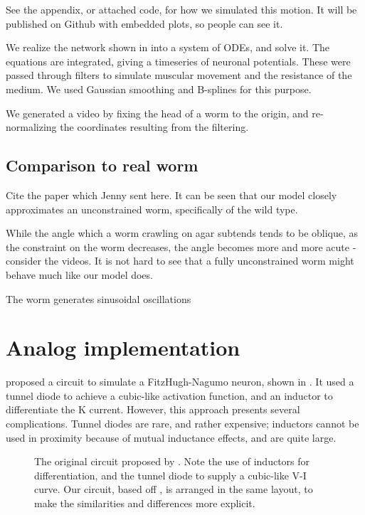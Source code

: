 \documentclass[
    11pt,
]{article}
\begin{document}
See the appendix, or attached code, for how we simulated this motion.  It will be published on Github with embedded plots, so people can see it.

We realize the network shown in  into a system of ODEs, and solve it.  The equations are integrated, giving a timeseries of neuronal potentials.  These were passed through filters to simulate muscular movement and the resistance of the medium.  We used Gaussian smoothing and B-splines for this purpose.

We generated a video by fixing the head of a worm to the origin, and re-normalizing the coordinates resulting from the filtering.

\subsection{Comparison to real worm}

Cite the paper which Jenny sent here.  It can be seen that our model closely approximates an unconstrained worm, specifically of the wild type.

While the angle which a worm crawling on agar subtends tends to be oblique, as the constraint on the worm decreases, the angle becomes more and more acute - consider the videos.  It is not hard to see that a fully unconstrained worm might behave much like our model does.

The worm generates sinusoidal oscillations


\section{Analog implementation}

\citet{nagumo1962} proposed a circuit to simulate a FitzHugh-Nagumo neuron, shown in .  It used a tunnel diode to achieve a cubic-like activation function, and an inductor to differentiate the K current.  However, this approach presents several complications.  Tunnel diodes are rare, and rather expensive; inductors cannot be used in proximity because of mutual inductance effects, and are quite large.

\begin{figure}[h!]
    \centering
    \caption{The original circuit proposed by \citet{nagumo1962}.  Note the use of inductors for differentiation, and the tunnel diode to supply a cubic-like V-I curve.  Our circuit, based off \citet{keener1983}, is arranged in the same layout, to make the similarities and differences more explicit.}
    \label{fig: nagumo_ckt}
\end{figure}
\end{document}
